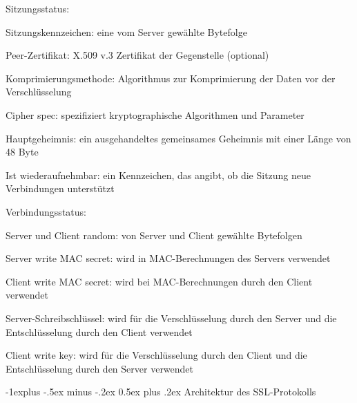 \documentclass[a4paper]{article}
\makeatletter
\renewcommand{\subsection}{\@startsection{subsection}{2}{0mm}%
 {-1explus -.5ex minus -.2ex}%
 {0.5ex plus .2ex}%
 {\normalfont\normalsize\bfseries}}
\makeatother
\begin{document}
\begin{multicols}{3}
\begin{itemize*}
            \begin{itemize*}
                  \item
                  Sitzungsstatus:

                  \begin{itemize*}
                        \item Sitzungskennzeichen: eine vom Server gewählte Bytefolge
                        \item Peer-Zertifikat: X.509 v.3 Zertifikat der Gegenstelle (optional)
                        \item Komprimierungsmethode: Algorithmus zur Komprimierung der Daten vor der Verschlüsselung
                        \item Cipher spec: spezifiziert kryptographische Algorithmen und Parameter
                        \item Hauptgeheimnis: ein ausgehandeltes gemeinsames Geheimnis mit einer Länge von 48 Byte
                        \item Ist wiederaufnehmbar: ein Kennzeichen, das angibt, ob die Sitzung neue Verbindungen unterstützt
                  \end{itemize*}
                  \item
                  Verbindungsstatus:

                  \begin{itemize*}
                        \item Server und Client random: von Server und Client gewählte Bytefolgen
                        \item Server write MAC secret: wird in MAC-Berechnungen des Servers verwendet
                        \item Client write MAC secret: wird bei MAC-Berechnungen durch den Client verwendet
                        \item Server-Schreibschlüssel: wird für die Verschlüsselung durch den Server und die Entschlüsselung durch den Client verwendet
                        \item Client write key: wird für die Verschlüsselung durch den Client und die Entschlüsselung durch den Server verwendet
                  \end{itemize*}
            \end{itemize*}


            \subsection{Architektur des
                  SSL-Protokolls}


\end{itemize*}
\end{multicols}
\end{document}

